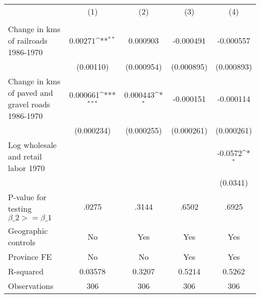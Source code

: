 {
\def\sym#1{\ifmmode^{#1}\else\(^{#1}\)\fi}
\begin{tabular}{l*{4}{c}}
\hline\hline
                &\multicolumn{1}{c}{(1)}&\multicolumn{1}{c}{(2)}&\multicolumn{1}{c}{(3)}&\multicolumn{1}{c}{(4)}\\
                &\multicolumn{1}{c}{}&\multicolumn{1}{c}{}&\multicolumn{1}{c}{}&\multicolumn{1}{c}{}\\
\hline
Change in kms of railroads 1986-1970&  0.00271\sym{**} & 0.000903         &-0.000491         &-0.000557         \\
                &(0.00110)         &(0.000954)         &(0.000895)         &(0.000893)         \\
[1em]
Change in kms of paved and gravel roads 1986-1970& 0.000661\sym{***}& 0.000443\sym{*}  &-0.000151         &-0.000114         \\
                &(0.000234)         &(0.000255)         &(0.000261)         &(0.000261)         \\
[1em]
Log wholesale and retail labor 1970&                  &                  &                  &  -0.0572\sym{*}  \\
                &                  &                  &                  & (0.0341)         \\
\hline
P-value for testing $\beta\_{2} >= \beta\_{1}$&    .0275         &    .3144         &    .6502         &    .6925         \\
Geographic controls&       No         &      Yes         &      Yes         &      Yes         \\
Province FE     &       No         &       No         &      Yes         &      Yes         \\
R-squared       &  0.03578         &   0.3207         &   0.5214         &   0.5262         \\
Observations    &      306         &      306         &      306         &      306         \\
\hline\hline
\end{tabular}
}
